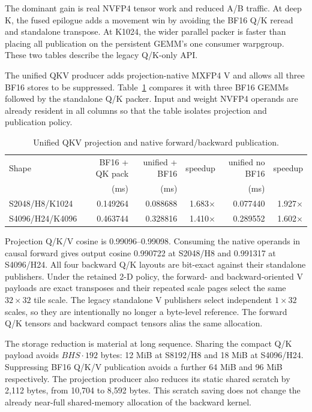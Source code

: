 The dominant gain is real NVFP4 tensor work and reduced A/B traffic.  At deep
K, the fused epilogue adds a movement win by avoiding the BF16 Q/K reread and
standalone transpose.  At K1024, the wider parallel packer is faster than
placing all publication on the persistent GEMM's one consumer warpgroup.
These two tables describe the legacy Q/K-only API.

The unified QKV producer adds projection-native MXFP4 V and allows all three
BF16 stores to be suppressed.  Table~\ref{tab:unified-qkv-projection} compares
it with three BF16 GEMMs followed by the standalone Q/K packer.  Input and
weight NVFP4 operands are already resident in all columns so that the table
isolates projection and publication policy.

\begin{table}[htbp]
\centering
\caption{Unified QKV projection and native forward/backward publication.}
\label{tab:unified-qkv-projection}
\small
\begin{tabular}{l rrr rr}
\toprule
Shape & BF16 + QK pack & unified + BF16 & speedup & unified no BF16 & speedup \\
 & (ms) & (ms) & & (ms) & \\
\midrule
S2048/H8/K1024   & 0.149264 & 0.088688 & 1.683$\times$ & 0.077440 & 1.927$\times$ \\
S4096/H24/K4096  & 0.463744 & 0.328816 & 1.410$\times$ & 0.289552 & 1.602$\times$ \\
\bottomrule
\end{tabular}
\end{table}

Projection Q/K/V cosine is 0.99096--0.99098.  Consuming the native operands
in causal forward gives output cosine 0.990722 at S2048/H8 and 0.991317 at
S4096/H24.  All four backward Q/K layouts are bit-exact against their
standalone publishers.  Under the retained 2-D policy, the forward- and
backward-oriented V payloads are exact transposes and their repeated scale
pages select the same $32\times32$ tile scale.  The legacy standalone V
publishers select independent $1\times32$ scales, so they are intentionally
no longer a byte-level reference.  The forward Q/K tensors and backward
compact tensors alias the same allocation.

The storage reduction is material at long sequence.  Sharing the compact Q/K
payload avoids $BHS\cdot192$ bytes: 12 MiB at S8192/H8 and 18 MiB at
S4096/H24.  Suppressing BF16 Q/K/V publication avoids a further 64 MiB and
96 MiB respectively.  The projection producer also reduces its static shared
scratch by 2,112 bytes, from 10,704 to 8,592 bytes.  This scratch saving does
not change the already near-full shared-memory allocation of the backward
kernel.

